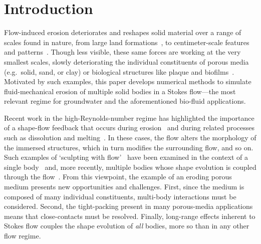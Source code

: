 \documentclass[preprint, 10pt]{elsarticle}
\begin{document}
\maketitle

\section{Introduction\label{s:intro}}
Flow-induced erosion deteriorates and reshapes solid material over a range of scales found in nature, from large land formations~\cite{han1969, Rothman2012, coh-dev-sey-yi-szy-rot2015}, to centimeter-scale features and patterns~\cite{daerr2003erosion}. Though less visible, these same forces are working at the very smallest scales, slowly deteriorating the individual constituents of porous media (e.g.~solid, sand, or clay) or biological structures like plaque and biofilms~\cite{bear2013dynamics, pic-van-hei2000, sha2002, gro-gij-van-fer-hat-van-yua-wen2007}. Motivated by such examples, this paper develops numerical methods to simulate fluid-mechanical erosion of multiple solid bodies in a Stokes flow---the most relevant regime for groundwater and the aforementioned bio-fluid applications.

Recent work in the high-Reynolds-number regime has highlighted the importance of a shape-flow feedback that occurs during erosion~\cite{ris-moo-chi-she-zha2012, moo-ris-chi-zha-she2013, hewett2017evolution, moore2017riemann} and during related processes such as dissolution and melting~\cite{Huang2015, kondratiuk2015steadily, rycroft2016asymmetric, cohen2016erosion, hewett2017pear, claudin2017dissolution}.  In these cases, the flow alters the morphology of the immersed structures, which in turn modifies the surrounding flow, and so on. Such examples of `sculpting with flow'~\cite{ristroph2018sculpting} have been examined in the context of a single body~\cite{ris-moo-chi-she-zha2012, moore2017riemann} and, more recently, multiple bodies whose shape evolution is coupled through the flow~\cite{hewett2017evolution}. From this viewpoint, the example of an eroding porous medium presents new opportunities and challenges. First, since the medium is composed of many individual constituents, multi-body interactions must be considered. Second, the tight-packing present in many porous-media applications means that close-contacts must be resolved. Finally, long-range effects inherent to Stokes flow couples the shape evolution of {\em all} bodies, more so than in any other flow regime.
\end{document}
